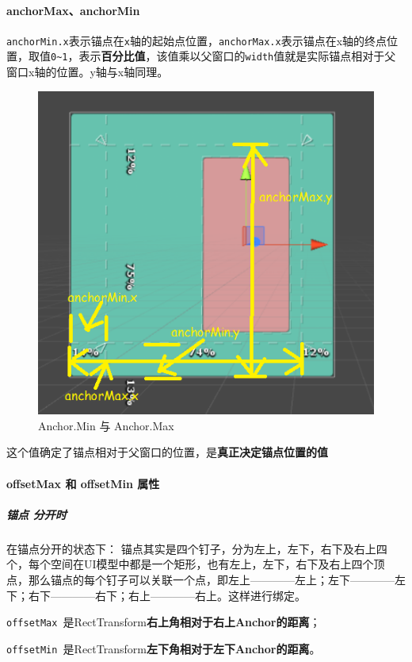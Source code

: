 \documentclass[UTF8,a4paper,12pt]{ctexbook}
\begin{document}
			\paragraph{anchorMax、anchorMin}
				\verb|anchorMin.x|表示锚点在\verb|x|轴的起始点位置，\verb|anchorMax.x|表示锚点在x轴的终点位置，取值\verb|0~1|，表示\textbf{百分比值}，该值乘以父窗口的\verb|width|值就是实际锚点相对于父窗口x轴的位置。y轴与x轴同理。
		
					\begin{figure}[H]
						\centering
						\includegraphics[scale=0.8]{Anchors-3.png}
						\caption{Anchor.Min 与 Anchor.Max}
					\end{figure}
		
				这个值确定了锚点相对于父窗口的位置，是\textbf{真正决定锚点位置的值}
				
			\paragraph{offsetMax 和 offsetMin 属性}
				\subparagraph{锚点 分开时}
					在锚点分开的状态下： 锚点其实是四个钉子，分为左上，左下，右下及右上四个，每个空间在UI模型中都是一个矩形，也有左上，左下，右下及右上四个顶点，那么锚点的每个钉子可以关联一个点，即左上————左上；左下————左下；右下————右下；右上————右上。这样进行绑定。
					
					\verb|offsetMax |是RectTransform\textbf{右上角相对于右上Anchor的距离}；
			
					\verb|offsetMin |是RectTransform\textbf{左下角相对于左下Anchor的距离}。
			
\end{document}
